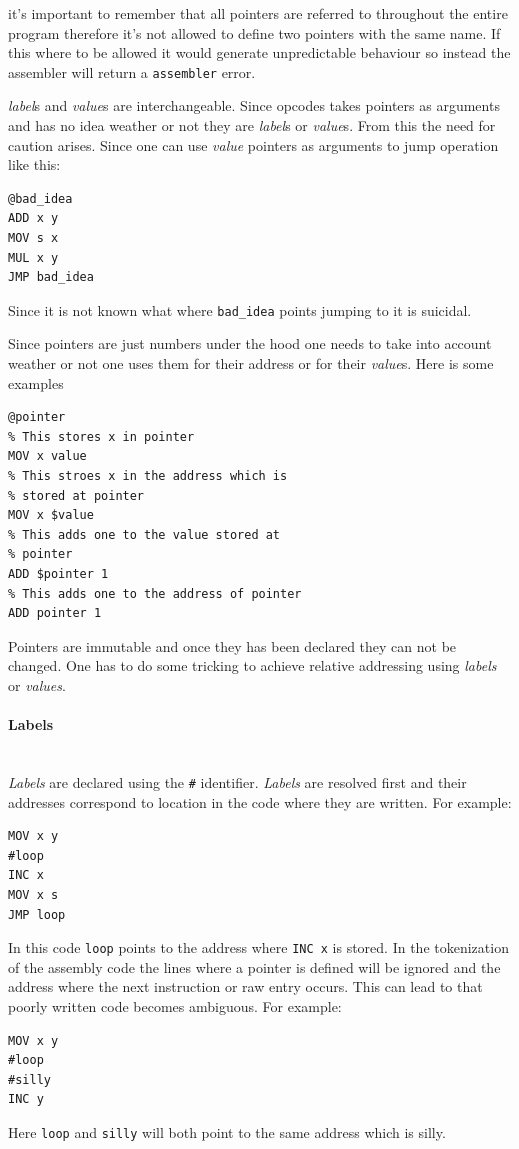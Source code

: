 \documentclass{article}
\newcommand{\V}{\verb}
\begin{document}
it's important to remember that all pointers are referred to throughout the entire
program therefore it's not allowed to define two pointers with the same name. If
this where to be allowed it would generate unpredictable behaviour so instead
the assembler will return a \V+assembler+ error.

\emph{label}s and \emph{value}s are interchangeable. Since opcodes takes pointers as arguments
and has no idea weather or not they are \emph{label}s or \emph{value}s. From this the need for
caution arises. Since one can use \emph{value} pointers as arguments to jump operation
like this:
\begin{verbatim}
@bad_idea
ADD x y
MOV s x
MUL x y
JMP bad_idea
\end{verbatim}
Since it is not known what where \V+bad_idea+ points jumping to it is suicidal.

Since pointers are just numbers under the hood one needs to take into account
weather or not one uses them for their address or for their \emph{value}s. Here is some
examples
\begin{verbatim}
@pointer
% This stores x in pointer
MOV x value
% This stroes x in the address which is
% stored at pointer
MOV x $value
% This adds one to the value stored at
% pointer
ADD $pointer 1
% This adds one to the address of pointer
ADD pointer 1
\end{verbatim}

Pointers are immutable and once they has been declared they can not be changed.
One has to do some tricking to achieve relative addressing using \emph{labels} or
\emph{values}.


\paragraph{Labels} \
\\
\emph{Labels} are declared using the \V+#+ identifier.
\emph{Labels} are resolved first and their addresses
correspond to location in the code where they are written. For example:
\begin{verbatim}
MOV x y
#loop
INC x
MOV x s
JMP loop
\end{verbatim}
In this code \V+loop+ points to the address where \V+INC x+ is stored. In the
tokenization of the assembly code the lines where a pointer is defined will be
ignored and the address where the next instruction or raw entry occurs. This can
lead to that poorly written code becomes ambiguous. For example:
\begin{verbatim}
MOV x y
#loop
#silly
INC y
\end{verbatim}
Here \V+loop+ and \V+silly+ will both point to the same address which is silly.
\end{document}
